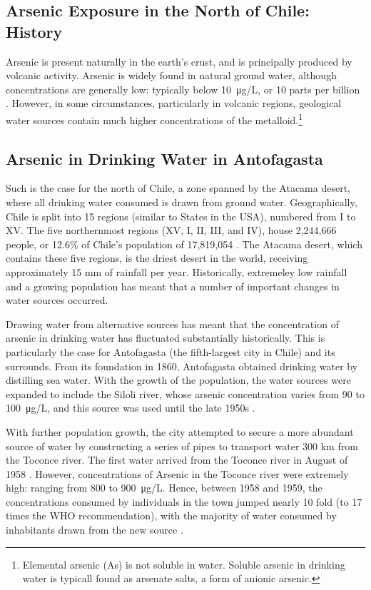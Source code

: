 \documentclass{article}[12pt,subeqn]
\begin{document}
\begin{spacing}{1.4}
\section{Arsenic Exposure in the North of Chile: History}
Arsenic is present naturally in the earth's crust, and is principally
produced by volcanic activity.  Arsenic is widely found in natural
ground water, although concentrations are generally low: typically
below \SI{10}{\micro\gram}/L, or 10 parts per billion \citep{WHO2001}.
However, in some circumstances, particularly in volcanic regions,
geological water sources contain much higher concentrations of the
metalloid.\footnote{Elemental arsenic (As) is not soluble in water.
Soluble arsenic in drinking water is typicall found as arsenate salts,
a form of anionic arsenic.} 

\subsection{Arsenic in Drinking Water in Antofagasta}
Such is the case for the north of Chile, a zone spanned by the Atacama
desert, where all drinking water consumed is drawn from ground
water. Geographically, Chile is split into 15 regions (similar to   
States in the USA), numbered from I to XV.  The five northernmost
regions (XV, I, II, III, and IV), house 2,244,666 people, or 12.6\% of
Chile's population of 17,819,054 \citep{INE2014}.  The Atacama desert,
which contains these five regions, is the driest desert in the world,
receiving approximately 15 mm of rainfall per year.  Historically,
extremeley low rainfall and a growing population has meant that a
number of important changes in water sources occurred.

Drawing water from alternative sources has meant that the
concentration of arsenic in drinking water has fluctuated
substantially historically.  This is particularly the case for
Antofagasta (the fifth-largest city in Chile) and its surrounds.
From its foundation in 1860, Antofagasta obtained drinking water by
distilling sea water.  With the growth of the population, the
water sources were expanded to include the Siloli river, whose arsenic
concentration varies from 90 to \SI{100}{\micro\gram}/L, and this
source was used until the late 1950s \citep{FerreccioSancha2006}. 


With further population growth, the city attempted to secure a more
abundant source of water by constructing a series of pipes to
transport water 300 km from the Toconce river.  The first water
arrived from the Toconce river in August of 1958
\citep{MainoRecabarren2012,FerreccioSancha2006}. However,
concentrations of Arsenic in the Toconce river were extremely high:
ranging from 800 to \SI{900}{\micro\gram}/L.  Hence, between 1958 and
1959, the concentrations consumed by individuals in the town jumped
nearly 10 fold (to 17 times the WHO recommendation), with the majority
of water consumed by inhabitants drawn from the new source
\citep{Fraser2012}. 


\end{spacing}
\end{document}
